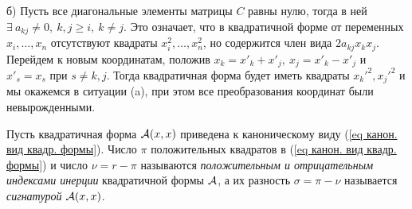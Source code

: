 \begin{proofocre}
\begin{enumerate}
\begin{enumerate}
        б) Пусть все диагональные элементы матрицы $C$ равны нулю, тогда в ней $\exists~a_{kj}\neq 0,~k,j\ge i,~k\neq j$. Это означает, что в квадратичной форме от переменных $x_i,\ldots,x_n$ отсутствуют квадраты $x_i^2,\ldots,x_n^2$, но содержится член вида $2a_{kj}x_kx_j$. Перейдем к новым координатам, положив $x_k=x'_k+x'_j,~x_j=x'_k-x'_j$ и $x'_s=x_s$ при $s\neq k,j$. Тогда квадратичная форма будет иметь квадраты ${x_k'}^2,{x_j'}^2$ и мы окажемся в ситуации (a), при этом все преобразования координат были невырожденными.
    \end{enumerate}
\end{enumerate}
\end{proofocre}

\begin{definition}
Пусть квадратичная форма ${\mathcal{A}}(x,x)$ приведена к каноническому виду (\ref{eq канон. вид квадр. формы}). Число $\pi$ положительных квадратов в (\ref{eq канон. вид квадр. формы}) и число $\nu=r-\pi$ называются \emph{положительным и отрицательным индексами инерции} квадратичной формы ${\mathcal{A}}$, а их разность $\sigma=\pi-\nu$ называется \emph{сигнатурой} ${\mathcal{A}}(x,x)$.
\end{definition}

